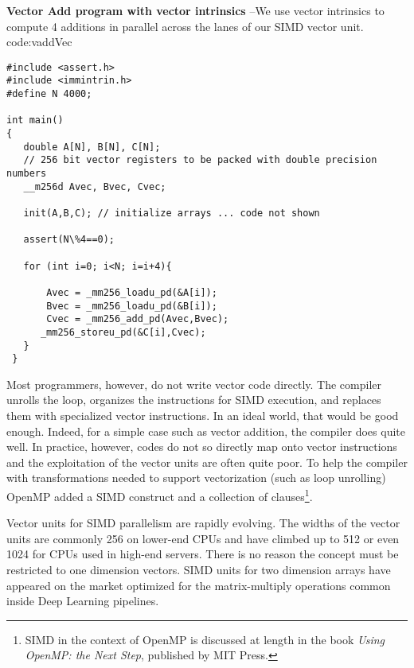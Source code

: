 \begin{CodeExample}%
{\textbf{Vector Add program with vector intrinsics} --\small We use vector intrinsics to compute 
4 additions in parallel across the lanes of our SIMD vector unit. 
}%
{code:vaddVec}
\begin{lstlisting}
#include <assert.h>
#include <immintrin.h>
#define N 4000;

int main()
{
   double A[N], B[N], C[N];
   // 256 bit vector registers to be packed with double precision numbers
   __m256d Avec, Bvec, Cvec;    
     
   init(A,B,C); // initialize arrays ... code not shown
   
   assert(N\%4==0);

   for (int i=0; i<N; i=i+4){

       Avec = _mm256_loadu_pd(&A[i]);
       Bvec = _mm256_loadu_pd(&B[i]);
       Cvec = _mm256_add_pd(Avec,Bvec);
      _mm256_storeu_pd(&C[i],Cvec);
   }
 }
\end{lstlisting}
\end{CodeExample}



Most programmers, however, do not write vector code directly.  The compiler unrolls the loop, organizes the instructions for SIMD
execution, and replaces them with specialized vector instructions.  In an ideal world, that would be good enough. Indeed,
for a simple case such as vector addition, the compiler does quite well.  In practice, however, codes do not so directly map
onto vector instructions and the exploitation of the vector units are often quite poor.
To help the compiler with transformations needed to support vectorization (such as loop unrolling) OpenMP added
a SIMD construct and a collection of clauses\footnote{SIMD in the context of OpenMP is discussed at length in the book
\emph{Using OpenMP: the Next Step}, published by MIT Press.}.

Vector units for SIMD parallelism are rapidly evolving.  The widths of the vector units are commonly 256 on lower-end
CPUs and have climbed up to 512 or even 1024 for CPUs used in high-end servers.  There is no reason the concept must 
be restricted to one dimension vectors.   SIMD units for two dimension arrays have appeared on the market optimized
for the matrix-multiply operations common inside Deep Learning pipelines. 

